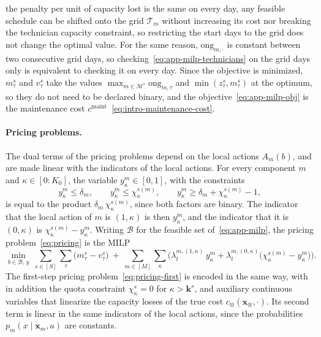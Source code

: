 \documentclass{article}
\begin{document}
the penalty per unit of capacity lost is the same on every day, any feasible schedule can be shifted onto the grid $\mathcal{T}_m$ without increasing
its cost nor breaking the technician capacity constraint, so restricting the start days to the grid does not change
the optimal value. For the same reason, $\mathrm{ong}_{m,\cdot}$ is constant between two consecutive grid days, so
checking~\eqref{eq:app-milp-technicians} on the grid days only is equivalent to checking it on every day. Since the
objective is minimized, $m^s_\tau$ and $v^s_\tau$ take the values $\max_{m \in \mathcal{M}^s} \mathrm{ong}_{m,\tau}$
and $\min(z^s_\tau, m^s_\tau)$ at the optimum, so they do not need to be declared binary, and the
objective~\eqref{eq:app-milp-obj} is the maintenance cost $c^{\mathrm{maint}}$~\eqref{eq:intro-maintenance-cost}.

\paragraph{Pricing problems.} The dual terms of the pricing problems depend on the local actions $A_m(b)$,
and are made linear with the indicators of the local actions. For every component $m$ and $\kappa
\in [0:K_0]$, the variable $y^m_\kappa \in [0,1]$, with the constraints
\[
y^m_\kappa \le \delta_m, \qquad y^m_\kappa \le \chi^{s(m)}_\kappa, \qquad y^m_\kappa \ge \delta_m +
\chi^{s(m)}_\kappa - 1,
\]
is equal to the product $\delta_m\, \chi^{s(m)}_\kappa$, since both factors are binary. The indicator
that the local action of $m$ is $(1, \kappa)$ is then $y^m_\kappa$, and the indicator that it is $(0, \kappa)$ is
$\chi^{s(m)}_\kappa - y^m_\kappa$. Writing $\mathcal{B}$ for the feasible set of~\eqref{eq:app-milp},
the pricing problem~\eqref{eq:pricing} is the MILP
\begin{equation}
\label{eq:intro-milp}
\min_{b \in \mathcal{B},\, y} \ \sum_{s \in [S]} \sum_{\tau} \big(m^s_\tau - v^s_\tau\big) \ +\ \sum_{m \in [M]}
\sum_{\kappa} \Big( \lambda^{m,(1,\kappa)}_t\, y^m_\kappa + \lambda^{m,(0,\kappa)}_t \big(\chi^{s(m)}_\kappa
- y^m_\kappa\big) \Big).
\end{equation}
The first-step pricing problem~\eqref{eq:pricing-first} is encoded in the same way, with in addition the quota
constraint $\chi^s_\kappa = 0$ for $\kappa > \mathbf{k}^s$, and auxiliary continuous variables that
linearize the capacity losses of the true cost $c_\otimes(\mathbf{x}_\otimes, \cdot)$. Its second term is linear in the
same indicators of the local actions, since the probabilities $p_m(x \mid \mathbf{x}_m, a)$ are constants.
 
\end{document}
